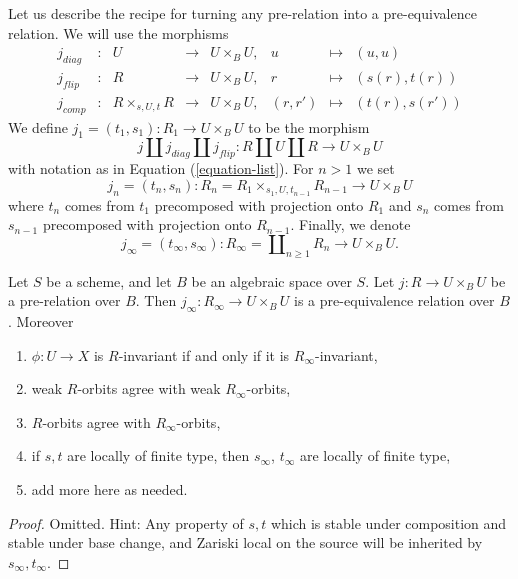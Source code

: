 \noindent
Let us describe the recipe for turning any pre-relation into a
pre-equivalence relation. We will use the morphisms
\begin{equation}
\label{equation-list}
\begin{matrix}
j_{diag} &
: &
U &
\longrightarrow &
U \times_B U, &
u &
\longmapsto &
(u, u) \\
j_{flip} &
: &
R &
\longrightarrow &
U \times_B U, &
r &
\longmapsto &
(s(r), t(r)) \\
j_{comp} &
: &
R \times_{s, U, t} R &
\longrightarrow &
U \times_B U, &
(r, r') &
\longmapsto &
(t(r), s(r'))
\end{matrix}
\end{equation}
We define $j_1 = (t_1, s_1) : R_1 \to U \times_B U$ to be the morphism
$$
j \amalg j_{diag} \amalg j_{flip} :
R \amalg U \amalg R
\longrightarrow
U \times_B U
$$
with notation as in
Equation (\ref{equation-list}).
For $n > 1$ we set
$$
j_n = (t_n, s_n) :
R_n = R_1 \times_{s_1, U, t_{n - 1}} R_{n - 1} \longrightarrow U \times_B U
$$
where $t_n$ comes from $t_1$ precomposed with projection onto $R_1$ and
$s_n$ comes from $s_{n - 1}$ precomposed with projection onto $R_{n - 1}$.
Finally, we denote
$$
j_\infty = (t_\infty, s_\infty) :
R_\infty = \coprod\nolimits_{n \geq 1} R_n 
\longrightarrow
U \times_B U.
$$

\begin{lemma}
\label{lemma-make-pre-equivalence}
Let $S$ be a scheme, and let $B$ be an algebraic space over $S$.
Let $j : R \to U \times_B U$ be a pre-relation over $B$.
Then $j_\infty : R_\infty \to U \times_B U$ is a
pre-equivalence relation over $B$. Moreover
\begin{enumerate}
\item $\phi : U \to X$ is $R$-invariant if and only if it is
$R_\infty$-invariant,
\item weak $R$-orbits agree with weak $R_\infty$-orbits,
\item $R$-orbits agree with $R_\infty$-orbits,
\item if $s, t$ are locally of finite type, then $s_\infty$, $t_\infty$
are locally of finite type,
\item add more here as needed.
\end{enumerate}
\end{lemma}

\begin{proof}
Omitted. Hint: Any property of $s, t$ which is stable under composition
and stable under base change, and Zariski local on the source
will be inherited by $s_\infty, t_\infty$.
\end{proof}

